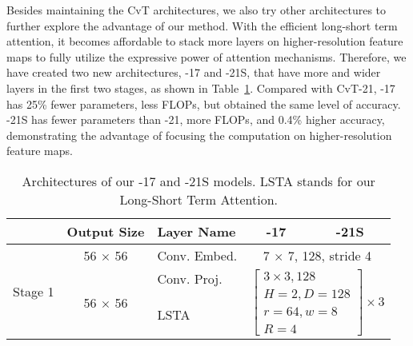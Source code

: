 Besides maintaining the CvT architectures, we also try other architectures to further explore the advantage of our method. With the efficient long-short term attention, it becomes affordable to stack more layers on higher-resolution feature maps to fully utilize the expressive power of attention mechanisms. Therefore, we have created two new architectures, \cvtname{}-17 and \cvtname{}-21S, that have more and wider layers in the first two stages, as shown in Table~\ref{tbl:cvt_customized}. Compared with CvT-21, \cvtname{}-17 has 25\% fewer parameters, less FLOPs, but obtained the same level of accuracy. \cvtname{}-21S has fewer parameters than \cvtname{}-21, more FLOPs, and 0.4\% higher accuracy, demonstrating the advantage of focusing the computation on higher-resolution feature maps.


\begin{table}[]
\centering
\caption{Architectures of our \cvtname{}-17 and \cvtname{}-21S models. LSTA stands for our Long-Short Term Attention.}
\label{tbl:cvt_customized}
\begin{tabular}{c|c|l|c|c}
\hline
                         & Output Size                  & Layer Name   & \cvtname{}-17                                                                                           & \cvtname{}-21S                                                                                          \\ \hline
\multirow{4}{*}{Stage 1} & 56 $\times$ 56                  & Conv. Embed. & \multicolumn{2}{c}{7 $\times$ 7, 128, stride 4}                                                                                                                                                               \\ \cline{2-5} 
                         & \multirow{4}{*}{56 $\times$ 56} & Conv. Proj.  & \multicolumn{2}{c}{\multirow{4}{*}{$\begin{bmatrix}3\times 3, 128\\ H=2, D=128 \\ r=64, w=8\\ R=4\end{bmatrix}\times 3$}}                                                                                   \\
                         &                              & \multirow{2}{*}{LSTA}       & \multicolumn{2}{c}{}               \\
                         &                              &                              & \multicolumn{2}{c}{}               \\

\end{tabular}
\end{table}
